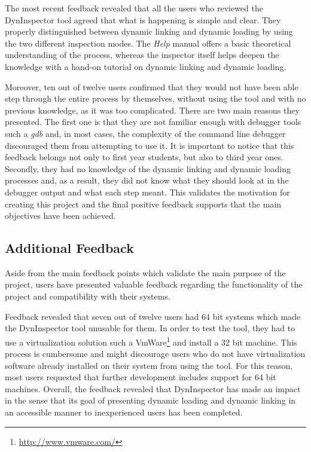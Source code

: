 The most recent feedback revealed that all the users who reviewed the DynInspector tool agreed that what is happening is simple and clear. They properly distinguished between dynamic linking and dynamic loading by using the two different inspection modes. The \textit{Help} manual offers a basic theoretical understanding of the process, whereas the inspector itself helps deepen the knowledge with a hand-on tutorial on dynamic linking and dynamic loading.

Moreover, ten out of twelve users confirmed that they would not have been able step through the entire process by themselves, without using the tool and with no previous knowledge, as it was too complicated. There are two main reasons they presented. The first one is that they are not familiar enough with debugger tools such a \textit{gdb} and, in most cases, the complexity of the command line debugger discouraged them from attempting to use it. It is important to notice that this feedback belongs not only to first year students, but also to third year ones. Secondly, they had no knowledge of the dynamic linking and dynamic loading processes and, as a result, they did not know what they should look at in the debugger output and what each step meant. This validates the motivation for creating this project and the final positive feedback supports that the main objectives have been achieved.
 
\subsection{Additional Feedback}

Aside from the main feedback points which validate the main purpose of the project, users have presented valuable feedback regarding the functionality of the project and compatibility with their systems.

Feedback revealed that seven out of twelve users had 64 bit systems which made the DynInspector tool unusable for them. In order to test the tool, they had to use a virtualization solution such a VmWare\footnote{\url{http://www.vmware.com/}} and install a 32 bit machine. This process is cumbersome and might discourage users who do not have virtualization software already installed on their system from using the tool. For this reason, most users requested that further development includes support for 64 bit machines.
Overall, the feedback revealed that DynInspector has made an impact in the sense that its goal of presenting dynamic loading and dynamic linking in an accessible manner to inexperienced users has been completed.
